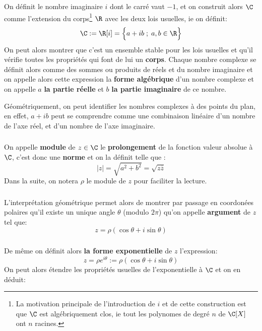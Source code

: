 \chapter*{} %

On définit le nombre imaginaire \(i\) dont le carré vaut \(-1\), et on construit alors \(\C\) comme l'extension du corps\footnote[1]{La motivation principale de l'introduction de \(i\) et de cette construction est que \(\C\) est algébriquement clos, ie tout les polynomes de degré \(n\) de \(\C[X]\) ont \(n\) racines.} \(\R\) avec les deux lois usuelles, ie on définit:
\[
   \C := \R[i] = \Bigl\{a + ib \; ; \; a, b \in \R \Bigl\}
\]
On peut alors montrer que c'est un ensemble stable pour les lois usuelles et qu'il vérifie toutes les propriétés qui font de lui un \textbf{corps}.\+
Chaque nombre complexe se définit alors comme des sommes ou produits de réels et du nombre imaginaire et on appelle alors cette expression la \textbf{forme algébrique} d'un nombre complexe et on appelle \(a\) \textbf{la partie réelle} et \(b\) \textbf{la partie imaginaire} de ce nombre. \<

Géométriquement, on peut identifier les nombres complexes à des points du plan, en effet, \(a + ib\) peut se comprendre comme une combinaison linéaire d'un nombre de l'axe réel, et d'un nombre de l'axe imaginaire.

\subsection*{}
On appelle \textbf{module} de \(z \in \C\) le \textbf{prolongement} de la fonction valeur absolue à \(\C\), c'est donc une \textbf{norme} et on la définit telle que {:}
\[
   |z| = \sqrt{a^2 + b^2} = \sqrt{z\overline{z}} 
\]
Dans la suite, on notera \(\rho\) le module de \(z\) pour faciliter la lecture.

\subsection*{}
L'interprétation géométrique permet alors de montrer par passage en coordonées polaires qu'il existe un unique angle \(\theta\) (modulo \(2\pi\)) qu'on appelle \textbf{argument} de \(z\) tel que:
\[
    z = \rho(\cos\theta+i\sin\theta)   
\]

\subsection*{}
De même on définit alors \textbf{la forme exponentielle} de \(z\) l'expression:
\[
    z = \rho e^{i\theta} := \rho(\cos\theta+i\sin\theta)
\]
On peut alors étendre les propriétés usuelles de l'exponentielle à \(\C\) et on en déduit:

